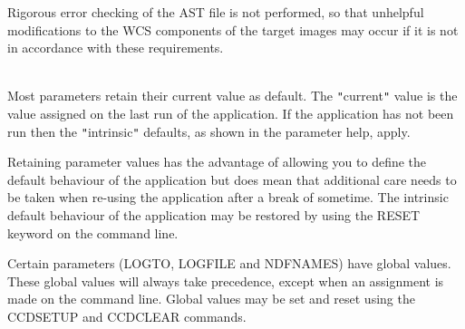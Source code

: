 \documentclass[twoside,11pt]{article}
\newcommand{\htmlref}[2]{#1}
\renewcommand{\_}{\texttt{\symbol{95}}}
\newcommand{\qt}[1]{{\tt "}#1{\tt "}}
\newcommand{\xroutine}[1]{\htmlref{{\sc #1}}{#1}}
\newcommand{\sstdiytopic}[2]{\item[#1:] \mbox{} \\[1.3ex] #2}
\newcommand{\sstdiytopic}[2]{\item[{#1}] #2 }
\begin{document}
{{         Rigorous error checking of the AST file is not performed, so
         that unhelpful modifications to the WCS components of the
         target images may occur if it is not in accordance with these
         requirements.
   }
   \sstdiytopic{
      Behaviour of parameters
   } {
      Most parameters retain their current value as default. The
      \qt{current} value is the value assigned on the last run of the
      application. If the application has not been run then the
      \qt{intrinsic} defaults, as shown in the parameter help, apply.

      Retaining parameter values has the advantage of allowing you to
      define the default behaviour of the application but does mean
      that additional care needs to be taken when re-using the
      application after a break of sometime. The intrinsic default
      behaviour of the application may be restored by using the RESET
      keyword on the command line.

      Certain parameters (LOGTO, LOGFILE and NDFNAMES) have global
      values. These global values will always take precedence, except
      when an assignment is made on the command line.  Global values may
      be set and reset using the \xroutine{CCDSETUP} and 
      \xroutine{CCDCLEAR} commands.
   }
}
\end{document}
